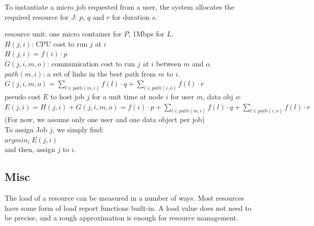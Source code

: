 To instantiate a micro job requested from a user, the system allocates
the required resource for $J$: $p$, $q$ and $r$ for duration $s$.



resource unit: one micro container for $P$, 1Mbps for $L$. \\
$H(j, i)$: CPU cost to run $j$ at $i$ \\
\( H(j, i) = f(i) \cdot p \)	\\
$G(j, i, m, o)$: communication cost to run $j$ at $i$ between $m$ and $o$. \\
$path(m,i)$: a set of links in the best path from $m$ to $i$. \\
\( G(j, i, m, o) = \sum_{l \in path(m,i)} f(l) \cdot q + \sum_{l \in path(i,o)} f(l) \cdot r \) \\
pseudo cost $E$ to host job $j$ for a unit time at node $i$ for user $m$, data obj $o$: \\
\( E(j, i)  =  H(j,i) + G(j,i,m,o) =  f(i) \cdot p + \sum_{l \in path(m,i)} f(l) \cdot q + \sum_{l \in path(i,o)} f(l) \cdot r \) \\
(For now, we assume only one user and one data object per job) \\
To assign Job $j$, we simply find: \\
\(  argmin_{i} \: E(j, i)   \)  \\
and then, assign $j$ to $i$. \\


\subsection{Misc}

The load of a resource can be measured in a number of ways.  Most
resources have some form of load report functions built-in.
A load value does not need to be precise, and a rough approximation is
enough for resource management.
